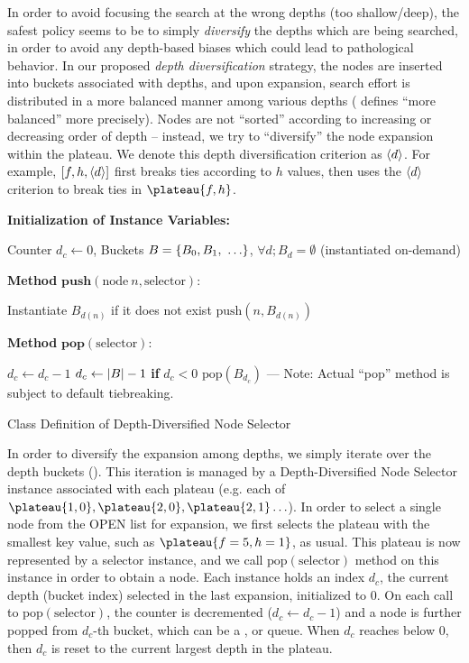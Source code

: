 In order to avoid focusing the search at the wrong depths (too shallow/deep), 
the safest policy seems to be to simply \emph{diversify} the depths which are being searched,
in order to avoid any depth-based biases which could lead to pathological behavior.
In our proposed \emph{depth diversification} strategy, the nodes are inserted into buckets
associated with depths, and upon expansion, search effort is distributed in a more balanced manner
among various depths ( defines ``more balanced''  more precisely).
Nodes are not  ``sorted''
according to increasing or decreasing order of depth -- instead, we try to 
``diversify'' the node expansion within the plateau.
We denote this depth diversification criterion as ${\left<d\right>}$. 
For example, $[f,h,{\left<d\right>}]$ first breaks ties according to $h$ values,
then uses the ${\left<d\right>}$ criterion to break ties in $\plateau{f,h}$.

\begin{algorithm}
 \textbf{Initialization of Instance Variables:}
\begin{algorithmic}
 \STATE Counter $d_c\leftarrow 0$, Buckets $B={\left\{B_0, B_1,\ \ldots\right\}}$, $\forall d; B_d=\emptyset$ (instantiated on-demand)
\end{algorithmic}
 \textbf{Method} $\textbf{push}(\text{node}\ n,\text{selector})$:
\begin{algorithmic}
 \STATE Instantiate $B_{d(n)}$ if it does not exist
 \STATE $\text{push}(n, B_{d(n)})$
\end{algorithmic}
 \textbf{Method} $\textbf{pop}(\text{selector})$:
\begin{algorithmic}
 \LOOP
 \STATE $d_c\leftarrow d_c-1$
 \STATE $d_c\leftarrow {\left|B\right|}-1$ \textbf{if} $d_c<0$
 \RETURN $\text{pop}(B_{d_c})$ --- Note: Actual ``pop'' method is subject to default tiebreaking.
 \ENDIF
 \ENDLOOP
\end{algorithmic}
\caption{Class Definition of Depth-Diversified Node Selector}
\label{alg:depth}
\end{algorithm}

In order to diversify the expansion among depths, we simply
iterate over the depth buckets ().
This iteration is managed by a Depth-Diversified Node Selector instance associated with each plateau (e.g. each of $\plateau{1,0}, \plateau{2,0}, \plateau{2,1}\ldots$).
In order to select a single node from the OPEN list for expansion,
we first selects the plateau with the smallest key value, such as $\plateau{f=5,h=1}$, as usual.
This plateau is now represented by a selector instance, and
we call $\text{pop}(\text{selector})$ method on this instance in order to obtain a node.
Each instance holds
an index $d_c$,
the current depth (bucket index) selected in the last expansion,
initialized to 0.
On each call to $\text{pop}(\text{selector})$,
the counter is decremented ($d_c\leftarrow d_c-1$) and
a node is further popped from $d_c$-th bucket, which can be a \lifo, \fifo or \ro queue.
When $d_c$ reaches below 0, then $d_c$
is reset to the current largest depth in the plateau.

